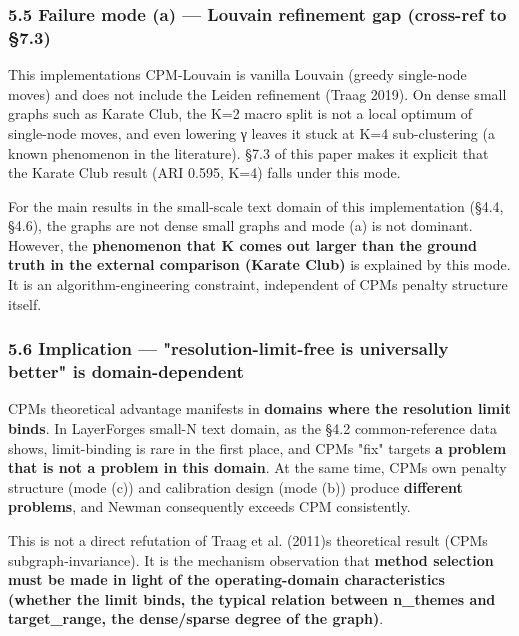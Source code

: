 \documentclass[
]{article}
\begin{document}
\subsubsection{5.5 Failure mode (a) --- Louvain refinement gap
(cross-ref to
§7.3)}\label{55-failure-mode-a--louvain-refinement-gap-cross-ref-to-73}

This implementation\textquotesingle s CPM-Louvain is vanilla Louvain
(greedy single-node moves) and does not include the Leiden refinement
(Traag 2019). On dense small graphs such as Karate Club, the K=2 macro
split is not a local optimum of single-node moves, and even lowering γ
leaves it stuck at K=4 sub-clustering (a known phenomenon in the
literature). §7.3 of this paper makes it explicit that the Karate Club
result (ARI 0.595, K=4) falls under this mode.

For the main results in the small-scale text domain of this
implementation (§4.4, §4.6), the graphs are not dense small graphs and
mode (a) is not dominant. However, the \textbf{phenomenon that K comes
out larger than the ground truth in the external comparison (Karate
Club)} is explained by this mode. It is an algorithm-engineering
constraint, independent of CPM\textquotesingle s penalty structure
itself.

\subsubsection{5.6 Implication --- "resolution-limit-free is universally
better" is
domain-dependent}\label{56-implication--resolution-limit-free-is-universally-better-is-domain-dependent}

CPM\textquotesingle s theoretical advantage manifests in \textbf{domains
where the resolution limit binds}. In LayerForge\textquotesingle s
small-N text domain, as the §4.2 common-reference data shows,
limit-binding is rare in the first place, and CPM\textquotesingle s
"fix" targets \textbf{a problem that is not a problem in this domain}.
At the same time, CPM\textquotesingle s own penalty structure (mode (c))
and calibration design (mode (b)) produce \textbf{different problems},
and Newman consequently exceeds CPM consistently.

This is not a direct refutation of Traag et al. (2011)\textquotesingle s
theoretical result (CPM\textquotesingle s subgraph-invariance). It is
the mechanism observation that \textbf{method selection must be made in
light of the operating-domain characteristics (whether the limit binds,
the typical relation between n\_themes and target\_range, the
dense/sparse degree of the graph)}.
\end{document}
